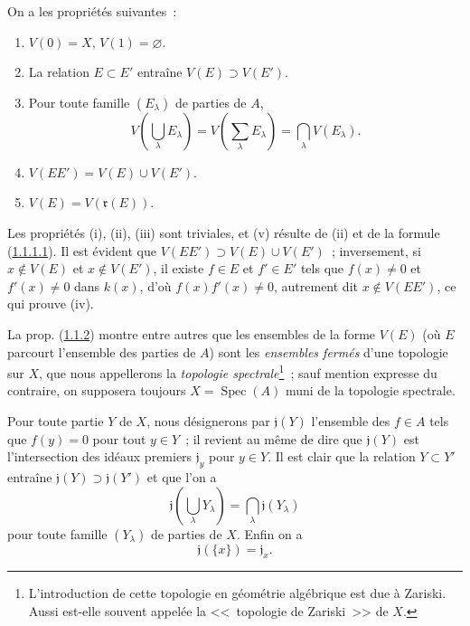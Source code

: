 \begin{proposition}[1.1.2]
\label{I.1.1.2-fr}
On a les propriétés suivantes~:
\begin{enumerate}
  \item[\rm(i)] $V(0)=X$, $V(1)=\varnothing$.
  \item[\rm(ii)] La relation $E\subset E'$ entraîne $V(E)\supset V(E')$.
  \item[\rm(iii)] Pour toute famille $(E_\lambda)$ de parties de $A$,
  \[
    V\left(\bigcup_\lambda E_\lambda\right)
      =V\left(\sum_\lambda E_\lambda\right)
      =\bigcap_\lambda V(E_\lambda).
  \]
  \item[\rm(iv)] $V(EE')=V(E)\cup V(E')$.
  \item[\rm(v)] $V(E)=V(\mathfrak{r}(E))$.
\end{enumerate}
\end{proposition}

Les propriétés (i), (ii), (iii) sont triviales, et (v) résulte de (ii) et de
la formule (\hyperref[I.1.1.1.1-fr]{1.1.1.1}). Il est évident que
$V(EE')\supset V(E)\cup V(E')$~; inversement, si $x\notin V(E)$ et
$x\notin V(E')$, il existe $f\in E$ et $f'\in E'$ tels que $f(x)\neq0$ et
$f'(x)\neq0$ dans $k(x)$, d'où $f(x)f'(x)\neq0$, autrement dit
$x\notin V(EE')$, ce qui prouve (iv).

La prop. (\hyperref[I.1.1.2-fr]{1.1.2}) montre entre autres que les ensembles
de la forme $V(E)$ (où $E$ parcourt l'ensemble des parties de $A$) sont les
\emph{ensembles fermés} d'une topologie sur $X$, que nous appellerons la
\emph{topologie spectrale}\footnote{L'introduction de cette topologie en
géométrie algébrique est due à Zariski. Aussi est-elle souvent appelée la
<<~topologie de Zariski~>> de $X$.}~; sauf mention expresse du contraire, on
supposera toujours $X=\operatorname{Spec}(A)$ muni de la topologie spectrale.

\begin{env}[1.1.3]
\label{I.1.1.3-fr}
Pour toute partie $Y$ de $X$, nous désignerons par $\mathfrak{j}(Y)$
l'ensemble des $f\in A$ tels que $f(y)=0$ pour tout $y\in Y$~; il revient au
même de dire que $\mathfrak{j}(Y)$ est l'intersection des idéaux premiers
$\mathfrak{j}_y$ pour $y\in Y$. Il est clair que la relation $Y\subset Y'$
entraîne $\mathfrak{j}(Y)\supset\mathfrak{j}(Y')$ et que l'on a
\begin{equation}
  \mathfrak{j}\left(\bigcup_\lambda Y_\lambda\right)
    =\bigcap_\lambda\mathfrak{j}(Y_\lambda)
  \tag{1.1.3.1}\label{I.1.1.3.1-fr}
\end{equation}
pour toute famille $(Y_\lambda)$ de parties de $X$. Enfin on a
\begin{equation}
  \mathfrak{j}(\{x\})=\mathfrak{j}_x.
  \tag{1.1.3.2}\label{I.1.1.3.2-fr}
\end{equation}
\end{env}

